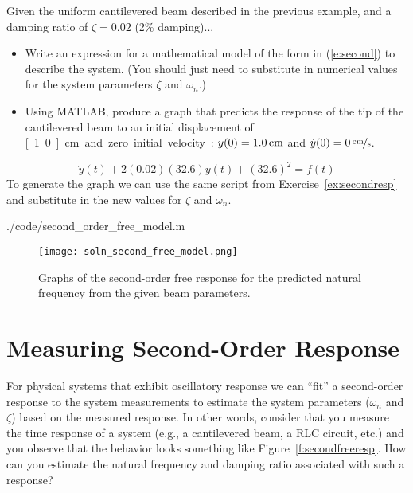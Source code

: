 \begin{ex}\label{ex:model2sim}
Given the uniform cantilevered beam described in the previous example, and a damping ratio of $\zeta=0.02$ (2\% damping)...
\begin{itemize}
\item Write an expression for a mathematical model of the form in (\ref{e:second}) to describe the system.  (You should just need to substitute in numerical values for the system parameters $\zeta$ and $\omega_n$.)
\item Using MATLAB, produce a graph that predicts the response of the tip of the cantilevered beam to an initial displacement of \unit[1.0]{cm} and zero initial velocity: $y(0)=\unit[1.0]{cm}$ and $\dot{y}(0) = \unitfrac[0]{cm}{s}$.
\end{itemize}
\end{ex}

\ifsolutions
\begin{soln}
\[
\ddot{y}(t) + 2 (0.02) (32.6)\dot{y}(t) + (32.6)^2 = f(t)
\]
To generate the graph we can use the same script from Exercise~\ref{ex:secondresp} and substitute in the new values for $\zeta$ and $\omega_n$.


{./code/second_order_free_model.m}

\begin{figure}[hbt]
\centering
\texttt{[image: soln\_second\_free\_model.png]}
\caption{Graphs of the second-order free response for the predicted natural frequency from the given beam parameters.}
\label{f:soln2freemodel}
\end{figure}

\end{soln}
\fi

\section{Measuring Second-Order Response}
For physical systems that exhibit oscillatory response we can ``fit'' a second-order response to the system measurements to estimate the system parameters ($\omega_n$ and $\zeta$) based on the measured response.  In other words, consider that you measure the time response of a system (e.g., a cantilevered beam, a RLC circuit, etc.) and you observe that the behavior looks something like Figure~\ref{f:secondfreeresp}.  How can you estimate the natural frequency and damping ratio associated with such a response?

